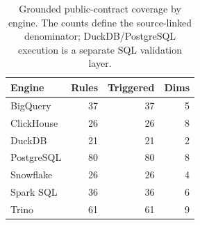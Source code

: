 \begin{table}[t]
\centering
\caption{Grounded public-contract coverage by engine. The counts define the source-linked denominator; DuckDB/PostgreSQL execution is a separate SQL validation layer.}
\label{tab:engine-coverage}
\small
\begin{tabular}{lrrr}
\toprule
Engine & Rules & Triggered & Dims \\
\midrule
BigQuery & 37 & 37 & 5 \\
ClickHouse & 26 & 26 & 8 \\
DuckDB & 21 & 21 & 2 \\
PostgreSQL & 80 & 80 & 8 \\
Snowflake & 26 & 26 & 4 \\
Spark SQL & 36 & 36 & 6 \\
Trino & 61 & 61 & 9 \\
\bottomrule
\end{tabular}
\end{table}
